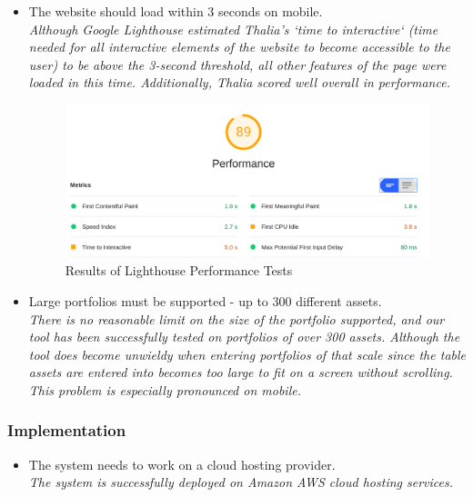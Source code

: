 \documentclass[main.tex]{subfiles}
\begin{document}
\begin{itemize}
\item The website should load within 3 seconds on mobile.\\
\textit{Although Google Lighthouse estimated Thalia’s `time to interactive` (time needed for all interactive elements of the website to become accessible to the user) to be above the 3-second threshold, all other features of the page were loaded in this time. Additionally, Thalia scored well overall in performance.}


\begin{figure}[H]
   \centering
   \includegraphics[scale=0.3]{07Evaluation/07Pictures/performanceLighthouse.png}
   \caption{Results of Lighthouse Performance Tests}
   \label{LighthousePerf}
\end{figure}



\item Large portfolios must be supported - up to 300 different assets.\\
\textit{There is no reasonable limit on the size of the portfolio supported, and our tool has been successfully tested on portfolios of over 300 assets. Although the tool does become unwieldy when entering portfolios of that scale since the table assets are entered into becomes too large to fit on a screen without scrolling. This problem is especially pronounced on mobile.}

\end{itemize}

\subsubsection{Implementation}
\begin{itemize}

\item The system needs to work on a cloud hosting provider.\\
\textit{The system is successfully deployed on Amazon AWS cloud hosting services.}

\end{itemize}
\end{document}
